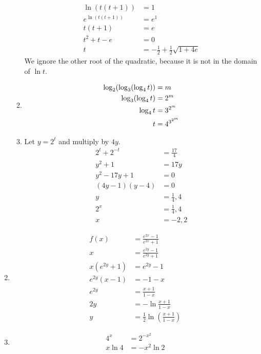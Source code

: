 \begin{enumerate}
\begin{enumerate}
\begin{align*}
            \ln (t(t+1)) &= 1 \\
            e^{\ln (t(t+1))} & = e^1\\
            t(t+1) &= e \\
            t^2 + t - e &= 0 \\
            t &= -\frac{1}{2} + \frac 1 2 \sqrt{1+4e}
        \end{align*}
        We ignore the other root of the quadratic, because it is not in the domain of $\ln t$. 
    	\item \begin{align*}
        	\log_2 (\log_3 ( \log_4 t)) &= m \\
            \log_3 ( \log_4 t) &= 2^m \\
            \log_4 t &= 3^{2^m} \\
            t &= {\large 4^{3^{2^m}}}
        \end{align*}
        \item Let $y=2^t$ and multiply by $4y$.
        \begin{align*}
        	2^t+2^{-t} &= \frac{17}{4} \\
            y^2 +1 &= 17y \\
            y^2 -17y +1 &= 0 \\
            (4y-1)(y-4) &= 0 \\
            y &= \frac 1 4, 4 \\
            2^x &= \frac 1 4, 4 \\
            x &= -2, 2
        \end{align*}
    \end{enumerate}
    \item \begin{align*} 
    f(x) &= \frac{e^{2x} -1}{e^{2x} + 1} \\
    x &= \frac{e^{2y} -1}{e^{2y} + 1} \\
    x(e^{2y} +1) &= e^{2y} - 1 \\
   	e^{2y}(x -1) &= -1 - x \\
    e^{2y} & = \frac{x+1}{1-x}\\
    2y &= - \ln \frac{x+1}{1-x} \\
    y &= \frac 1 2 \ln \left( \frac{x+1}{1-x} \right)
    \end{align*}
    \item 
    \begin{align*}
    	4^x &= 2^{-x^2} \\
        x \ln 4 &= -x^2 \ln 2 \\

\end{align*}
\end{enumerate}
